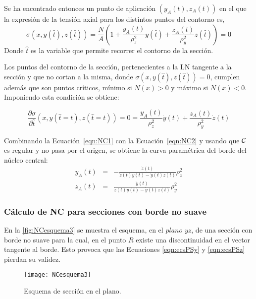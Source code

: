 Se ha encontrado entonces un punto de aplicación $(y_A(t),z_A(t))$ en el que la expresión de la tensión axial para los distintos puntos del contorno es,
\begin{equation}\label{eqn:NC1}
\sigma(x,y(\hat t),z(\hat t)) = \frac{N}{A} \left(1 +  \frac{ y_A(t)}{\rho_z^2} y(\hat t) +  \frac{ z_A(t)}{\rho_y^2} z(\hat t) \right)= 0
\end{equation}
Donde $\hat t$ es la variable que permite recorrer el contorno de la sección.



Los puntos del contorno de la sección, pertenecientes a la LN tangente a la sección y que no cortan a la misma, donde $\sigma(x,y(\hat t),z(\hat t)) = 0$, cumplen además que son puntos críticos, mínimo si $N(x)>0$ y máximo si $N(x)<0$. Imponiendo esta condición se obtiene:

\begin{equation}\label{eqn:NC2}
\frac{\partial \sigma}{\partial \hat t}(x,y(\hat t=t),z(\hat t=t)) = 0 = \frac{ y_A(t)}{\rho_z^2} \dot{y}(t) +  \frac{ z_A(t)}{\rho_y^2} \dot{z}(t)
\end{equation}

Combinando la Ecuación~\eqref{eqn:NC1} con la Ecuación~\eqref{eqn:NC2} y usando que ${\mathcal C}$ es regular y no pasa por el origen, se obtiene la curva paramétrica del borde del núcleo central:
%
\begin{eqnarray}
y_A(t) &=& - \frac{ \dot{z}(t) }{ \dot{z}(t) y(t) - \dot{y}(t) z(t) } \rho^2_z \label{eqn:ecsPSy} \\
z_A(t) &=& \frac{ \dot{y}(t) }{ \dot{z}(t) y(t) - \dot{y}(t) z(t) } \rho^2_y \label{eqn:ecsPSz}
\end{eqnarray}

\subsubsection{Cálculo de NC para secciones con borde no suave}

En la \autoref{fig:NCesquema3} se muestra el esquema, en el $plano$ $yz$, de una sección con borde no suave para la cual, en el punto $R$ existe una discontinuidad en el vector tangente al borde. %
%
Esto provoca que las Ecuaciones \eqref{eqn:ecsPSy} y \eqref{eqn:ecsPSz} pierdan su validez.

\begin{figure}[htb]
	\centering
	\texttt{[image: NCesquema3]}
	\caption{Esquema de sección en el plano.}
	\label{fig:NCesquema3}
\end{figure}

